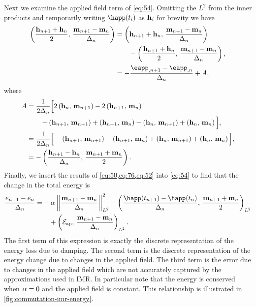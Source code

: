 Next we examine the applied field term of \cref{eq:54}.
Omitting the $L^2$ from the inner products and temporarily writing $\happ(t_i)$ as $\boldsymbol{\mathrm{h}}_i$ for brevity we have
\begin{equation}
  \begin{aligned}
    \ip{\frac{\hv_{n+1} + \hv_n}{2}}{\mpdmdt}
    &= \ip{\hv_{n+1} + \hv_n}{\mpdmdt} \\
    & \qquad - \ip{\frac{\hv_{n+1} + \hv_n}{2}}{\mpdmdt}, \\
    &= -\frac{\eapp_{, n+1} - \eapp_{, n}}{\dtn}  + A,
    \label{eq:76}
  \end{aligned}
\end{equation}
where
\begin{equation}
  \begin{aligned}
    A &= \frac{1}{2\Delta_{n}}\Big[ 2\left(\boldsymbol{\mathrm{h}}_n,\, \boldsymbol{\mathrm{m}}_{n+1} \right) - 2\left(\boldsymbol{\mathrm{h}}_{n+1},\, \boldsymbol{\mathrm{m}}_n \right) \\
    & \qquad - \left(\boldsymbol{\mathrm{h}}_{n+1},\, \boldsymbol{\mathrm{m}}_{n+1} \right) +\left(\boldsymbol{\mathrm{h}}_{n+1},\, \boldsymbol{\mathrm{m}}_n \right)
    - \left(\boldsymbol{\mathrm{h}}_n,\, \boldsymbol{\mathrm{m}}_{n+1} \right) + \left(\boldsymbol{\mathrm{h}}_n,\, \boldsymbol{\mathrm{m}}_n \right) \Big], \\
    &= \frac{1}{2\Delta_{n}}\Big[ - \left(\boldsymbol{\mathrm{h}}_{n+1},\, \boldsymbol{\mathrm{m}}_{n+1} \right) - \left(\boldsymbol{\mathrm{h}}_{n+1},\, \boldsymbol{\mathrm{m}}_n \right)
    + \left(\boldsymbol{\mathrm{h}}_n,\, \boldsymbol{\mathrm{m}}_{n+1} \right) + \left(\boldsymbol{\mathrm{h}}_n,\, \boldsymbol{\mathrm{m}}_n \right) \Big], \\
    &= - \left( \frac{\boldsymbol{\mathrm{h}}_{n+1} - \boldsymbol{\mathrm{h}}_n}{\Delta_{n}} ,\,  \frac{\boldsymbol{\mathrm{m}}_{n+1} + \boldsymbol{\mathrm{m}}_n}{2}  \right). \\
    \label{eq:52}
  \end{aligned}
\end{equation}
Finally, we insert the results of \cref{eq:50,eq:76,eq:52} into \cref{eq:54} to find that the change in the total energy is
\begin{equation}
  \begin{aligned}
    \frac{\e_{n+1} - \e_n}{\dtn} = &-\dampc \ltnorm{\mpdmdt}^2
    - \ltip{\frac{\happ(t_{n+1}) -\happ(t_n)}{\dtn}}{\frac{\mv_{n+1} + \mv_{n}}{2}} \\
    &\quad+ \ltip{\happerror}{\mpdmdt}.
    \label{eqn:imr-llg-energy}
  \end{aligned}
\end{equation}
The first term of this expression is exactly the discrete representation of the energy loss due to damping.
The second term is the discrete representation of the energy change due to changes in the applied field.
The third term is the error due to changes in the applied field which are not accurately captured by the approximations used in IMR.
In particular note that the energy is conserved when $\alpha = 0$ and the applied field is constant.
This relationship is illustrated in \cref{fig:commutation-imr-energy}.

